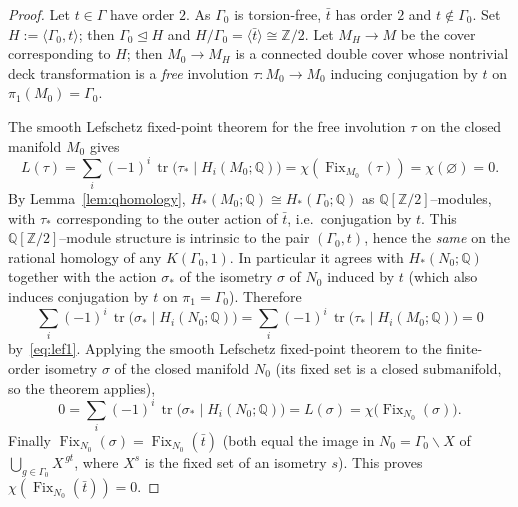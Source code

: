 \documentclass[12pt]{article}
\newcommand{\bQ}{\mathbb{Q}}
\newcommand{\bZ}{\mathbb{Z}}
\newcommand{\Fix}{\operatorname{Fix}}
\DeclareMathOperator{\tr}{tr}
\theoremstyle{definition}
\begin{document}
\begin{proof}
Let $t\in\Gamma$ have order $2$.  As $\Gamma_0$ is torsion-free, $\bar t$ has
order $2$ and $t\notin\Gamma_0$.  Set $H:=\langle\Gamma_0,t\rangle$; then
$\Gamma_0\trianglelefteq H$ and $H/\Gamma_0=\langle\bar t\rangle\cong\bZ/2$.  Let
$M_H\to M$ be the cover corresponding to $H$; then $M_0\to M_H$ is a connected
double cover whose nontrivial deck transformation is a \emph{free} involution
$\tau\colon M_0\to M_0$ inducing conjugation by $t$ on $\pi_1(M_0)=\Gamma_0$.

The smooth Lefschetz fixed-point theorem for the free involution $\tau$ on the
closed manifold $M_0$ gives
\begin{equation}\label{eq:lef1}
   L(\tau)=\sum_i(-1)^i\,\tr\bigl(\tau_*\mid H_i(M_0;\bQ)\bigr)
          =\chi(\Fix_{M_0}(\tau))=\chi(\varnothing)=0 .
\end{equation}
By Lemma~\ref{lem:qhomology}, $H_*(M_0;\bQ)\cong H_*(\Gamma_0;\bQ)$ as
$\bQ[\bZ/2]$--modules, with $\tau_*$ corresponding to the outer action of
$\bar t$, i.e.\ conjugation by $t$.  This $\bQ[\bZ/2]$--module structure is
intrinsic to the pair $(\Gamma_0,t)$, hence the \emph{same} on the rational
homology of any $K(\Gamma_0,1)$.  In particular it agrees with $H_*(N_0;\bQ)$
together with the action $\sigma_*$ of the isometry $\sigma$ of $N_0$ induced by
$t$ (which also induces conjugation by $t$ on $\pi_1=\Gamma_0$).  Therefore
\[
   \sum_i(-1)^i\,\tr\bigl(\sigma_*\mid H_i(N_0;\bQ)\bigr)
   =\sum_i(-1)^i\,\tr\bigl(\tau_*\mid H_i(M_0;\bQ)\bigr)=0
\]
by~\eqref{eq:lef1}.  Applying the smooth Lefschetz fixed-point theorem to the
finite-order isometry $\sigma$ of the closed manifold $N_0$ (its fixed set is a
closed submanifold, so the theorem applies),
\[
   0=\sum_i(-1)^i\,\tr\bigl(\sigma_*\mid H_i(N_0;\bQ)\bigr)
    =L(\sigma)=\chi\bigl(\Fix_{N_0}(\sigma)\bigr).
\]
Finally $\Fix_{N_0}(\sigma)=\Fix_{N_0}(\bar t)$ (both equal the image in
$N_0=\Gamma_0\backslash X$ of $\bigcup_{g\in\Gamma_0}X^{\,gt}$, where $X^{s}$ is
the fixed set of an isometry $s$).  This proves $\chi(\Fix_{N_0}(\bar t))=0$.
\end{proof}
\end{document}
